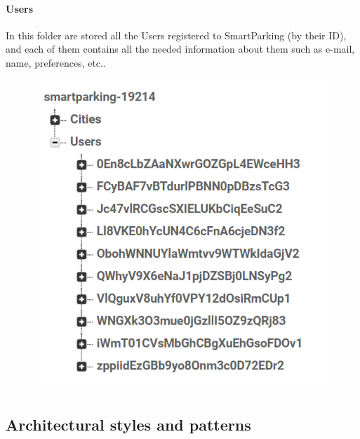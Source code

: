 \documentclass[11pt]{article} %
\begin{document}
\paragraph{Users} 
In this folder are stored all the Users registered to SmartParking (by their ID), and each of them contains all the needed information about them such as e-mail, name, preferences, etc.. 
\begin{figure}[H]
\centering
\includegraphics[scale=1]{db_users.png}
\end{figure}

\subsection{Architectural styles and patterns}
\end{document}
